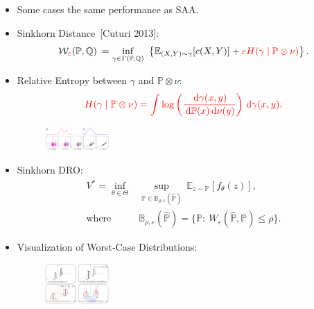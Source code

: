 \documentclass[landscape,a0b,final,a4resizeable]{include/a0poster}
\newcommand{\bP}{\mathbb{P}}
\newcommand{\bQ}{\mathbb{Q}}
\newcommand{\Reg}{\varepsilon}
\newcommand{\diff}{\,\mathrm{d}}
\begin{document}
\begin{poster}
\begin{multicols}{4}
\begin{itemize}
{\begin{itemize}
\item
Some cases the same performance as SAA.
\end{itemize}
}
\end{itemize}
\vspace{0.5in} 
\newpage
{}
\vspace{0.1in}
\begin{itemize}
\item
{
\LARGE
Sinkhorn Distance~[Cuturi 2013]: 
\[
\mathcal{W}_{\color{red}\Reg}(\bP, \bQ) \:= \inf_{
\substack{
\gamma\in\Gamma(\bP, \bQ)
}}~ \left\{\mathbb{E}_{(X,Y)\sim\gamma}[c(X,Y)] + {\color{red}\Reg H(\gamma\mid\bP\otimes\nu)}\right\}.
\]}
\vspace{0.05in}
\item
{
\LARGE
Relative Entropy between $\gamma$ and $\bP\otimes\nu$:
\[
{\color{red}H(\gamma\mid\bP\otimes\nu) = \int \log\left(\frac{\diff\gamma(x,y)}{\diff\bP(x)\diff\nu(y)}\right)\diff\gamma(x,y).}
\]
}
\begin{figure}[H]
\centering
\includegraphics[width=0.23\textwidth]{figures/diagram_Sinkhorn}
\end{figure}
\vspace{0.1in}
\item
{
\LARGE
Sinkhorn DRO:
\[
\begin{aligned}
V^* = \inf_{\theta\in\Theta}&\sup_{\mathbb{P}\in\mathbb{B}_{\rho,\Reg}(\widehat{\mathbb{P}})}~
\mathbb{E}_{z\sim \mathbb{P}}[f_{\theta}(z)],\\
\text{where }&\mathbb{B}_{\rho,\Reg}(\widehat{\mathbb{P}})=\big\{
\mathbb{P}:~W_{\Reg}(\widehat{\mathbb{P}}, \mathbb{P})\le \rho
\big\}.
\end{aligned}
\]
}
\vspace{0.2in}
\item
\vspace{0.2in}
{
\LARGE
Visualization of Worst-Case Distributions:
}
\vspace{0.2in}
\begin{figure}[H]
\centering
\includegraphics[width=0.23\textwidth]{figures/Fig_LFD}
\end{figure}
\end{itemize}












\end{multicols}
\end{poster}
\end{document}
